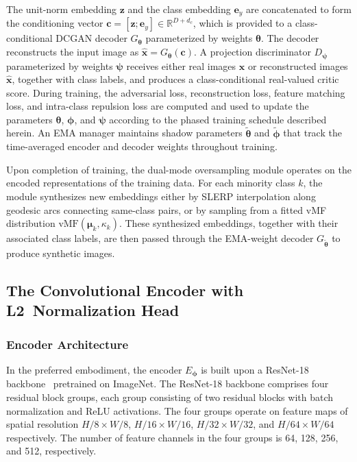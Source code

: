 \documentclass[12pt,letterpaper]{article}
\newcommand{\bz}{\mathbf{z}}
\newcommand{\bx}{\mathbf{x}}
\newcommand{\bc}{\mathbf{c}}
\newcommand{\btheta}{\bm{\theta}}
\newcommand{\bphi}{\bm{\phi}}
\newcommand{\bpsi}{\bm{\psi}}
\newcommand{\bmu}{\bm{\mu}}
\newcommand{\RR}{\mathbb{R}}
\begin{document}
The unit-norm embedding $\bz$ and the class embedding $\bm{e}_y$ are
concatenated to form the conditioning vector
$\bc = [\bz; \bm{e}_y] \in \RR^{D + d_c}$, which is provided to a
class-conditional DCGAN decoder $G_{\btheta}$ parameterized by weights
$\btheta$.  The decoder reconstructs the input image as
$\hat{\bx} = G_{\btheta}(\bc)$.  A projection discriminator $D_{\bpsi}$
parameterized by weights $\bpsi$ receives either real images $\bx$ or
reconstructed images $\hat{\bx}$, together with class labels, and produces a
class-conditional real-valued critic score.  During training, the adversarial
loss, reconstruction loss, feature matching loss, and intra-class repulsion
loss are computed and used to update the parameters $\btheta$, $\bphi$, and
$\bpsi$ according to the phased training schedule described herein.  An EMA
manager maintains shadow parameters $\tilde{\btheta}$ and $\tilde{\bphi}$
that track the time-averaged encoder and decoder weights throughout training.

Upon completion of training, the dual-mode oversampling module operates on
the encoded representations of the training data.  For each minority class
$k$, the module synthesizes new embeddings either by SLERP interpolation
along geodesic arcs connecting same-class pairs, or by sampling from a fitted
vMF distribution $\text{vMF}(\bmu_k, \kappa_k)$.  These synthesized
embeddings, together with their associated class labels, are then passed
through the EMA-weight decoder $G_{\tilde{\btheta}}$ to produce synthetic
images.

\subsection{The Convolutional Encoder with L2~Normalization Head}

\subsubsection{Encoder Architecture}

In the preferred embodiment, the encoder $E_{\bphi}$ is built upon a
ResNet-18 backbone~\cite{he2016} pretrained on ImageNet.  The ResNet-18
backbone comprises four residual block groups, each group consisting of two
residual blocks with batch normalization and ReLU activations.  The four
groups operate on feature maps of spatial resolution $H/8 \times W/8$,
$H/16 \times W/16$, $H/32 \times W/32$, and $H/64 \times W/64$
respectively.  The number of feature channels in the four groups is 64, 128,
256, and 512, respectively.
\end{document}

